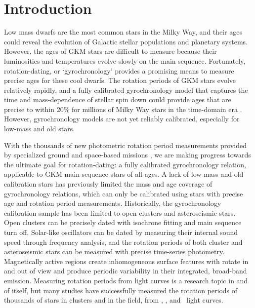 \section{Introduction}

Low mass dwarfs are the most common stars in the Milky Way, and their ages
could reveal the evolution of Galactic stellar populations and planetary
systems.
However, the ages of GKM stars are difficult to measure because their
luminosities and temperatures evolve slowly on the main sequence.
Fortunately, rotation-dating, or `gyrochronology’ provides a promising means
to measure precise ages for these cool dwarfs.
The rotation periods of GKM stars evolve relatively rapidly, and a fully
calibrated gyrochronology model that captures the time and mass-dependence of
stellar spin down could provide ages that are precise to within 20\% for
millions of Milky Way stars in the time-domain era \citep{epstein2014,
najita2016, angus2019}.
However, gyrochronology models are not yet reliably calibrated, especially for
low-mass and old stars.

With the thousands of new photometric rotation period measurements provided by
specialized ground and space-based missions \citep[particularly \kepler/\ktwo\
and \tess][]{borucki2010, howell2014, ricker2015}, we are making progress
towards the ultimate goal for rotation-dating: a fully calibrated
gyrochronology relation, applicable to GKM main-sequence stars of all ages.
A lack of low-mass and old calibration stars has previously limited the mass
and age coverage of gyrochronology relations, which can only be calibrated
using stars with precise age and rotation period measurements.
Historically, the gyrochronology calibration sample has been limited to open
clusters and asteroseismic stars.
Open clusters can be precisely dated with isochrone fitting and main sequence
turn off, Solar-like oscillators can be dated by measuring their internal
sound speed through frequency analysis, and the rotation periods of both
cluster and asteroseismic stars can be measured with precise time-series
photometry.
Magnetically active regions create inhomogeneous surface features with rotate
in and out of view and produce periodic variability in their integrated,
broad-band emission.
Measuring rotation periods from light curves is a research topic in and of
itself, but many studies have successfully measured the rotation periods of
thousands of stars in clusters and in the field, from \kepler, \ktwo, and
\tess\ light curves.

